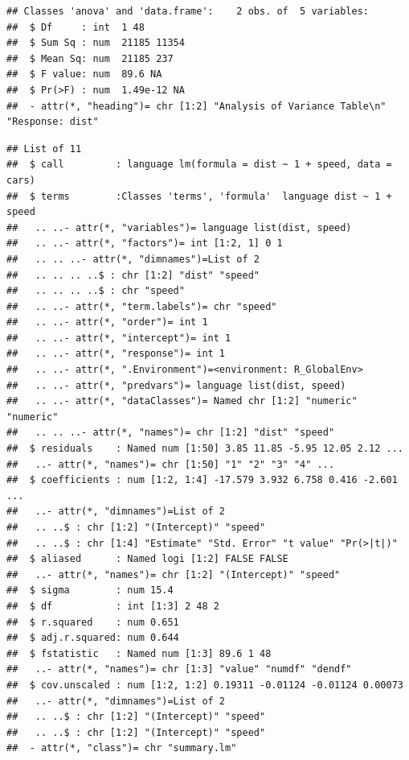 \documentclass[krantz2]{krantz}\usepackage{knitr}
\begin{document}
\begin{explainbox}
\begin{knitrout}\footnotesize
{}\color{fgcolor}\begin{kframe}
\begin{alltt}
\hlstd{(}
\end{alltt}
\begin{verbatim}
## Classes 'anova' and 'data.frame':	2 obs. of  5 variables:
##  $ Df     : int  1 48
##  $ Sum Sq : num  21185 11354
##  $ Mean Sq: num  21185 237
##  $ F value: num  89.6 NA
##  $ Pr(>F) : num  1.49e-12 NA
##  - attr(*, "heading")= chr [1:2] "Analysis of Variance Table\n" "Response: dist"
\end{verbatim}
\end{kframe}
\end{knitrout}

\begin{knitrout}\footnotesize
{}\color{fgcolor}\begin{kframe}
\begin{alltt}
\hlstd{(}
\end{alltt}
\begin{verbatim}
## List of 11
##  $ call         : language lm(formula = dist ~ 1 + speed, data = cars)
##  $ terms        :Classes 'terms', 'formula'  language dist ~ 1 + speed
##   .. ..- attr(*, "variables")= language list(dist, speed)
##   .. ..- attr(*, "factors")= int [1:2, 1] 0 1
##   .. .. ..- attr(*, "dimnames")=List of 2
##   .. .. .. ..$ : chr [1:2] "dist" "speed"
##   .. .. .. ..$ : chr "speed"
##   .. ..- attr(*, "term.labels")= chr "speed"
##   .. ..- attr(*, "order")= int 1
##   .. ..- attr(*, "intercept")= int 1
##   .. ..- attr(*, "response")= int 1
##   .. ..- attr(*, ".Environment")=<environment: R_GlobalEnv> 
##   .. ..- attr(*, "predvars")= language list(dist, speed)
##   .. ..- attr(*, "dataClasses")= Named chr [1:2] "numeric" "numeric"
##   .. .. ..- attr(*, "names")= chr [1:2] "dist" "speed"
##  $ residuals    : Named num [1:50] 3.85 11.85 -5.95 12.05 2.12 ...
##   ..- attr(*, "names")= chr [1:50] "1" "2" "3" "4" ...
##  $ coefficients : num [1:2, 1:4] -17.579 3.932 6.758 0.416 -2.601 ...
##   ..- attr(*, "dimnames")=List of 2
##   .. ..$ : chr [1:2] "(Intercept)" "speed"
##   .. ..$ : chr [1:4] "Estimate" "Std. Error" "t value" "Pr(>|t|)"
##  $ aliased      : Named logi [1:2] FALSE FALSE
##   ..- attr(*, "names")= chr [1:2] "(Intercept)" "speed"
##  $ sigma        : num 15.4
##  $ df           : int [1:3] 2 48 2
##  $ r.squared    : num 0.651
##  $ adj.r.squared: num 0.644
##  $ fstatistic   : Named num [1:3] 89.6 1 48
##   ..- attr(*, "names")= chr [1:3] "value" "numdf" "dendf"
##  $ cov.unscaled : num [1:2, 1:2] 0.19311 -0.01124 -0.01124 0.00073
##   ..- attr(*, "dimnames")=List of 2
##   .. ..$ : chr [1:2] "(Intercept)" "speed"
##   .. ..$ : chr [1:2] "(Intercept)" "speed"
##  - attr(*, "class")= chr "summary.lm"
\end{verbatim}
\end{kframe}
\end{knitrout}


\end{explainbox}
\end{document}
